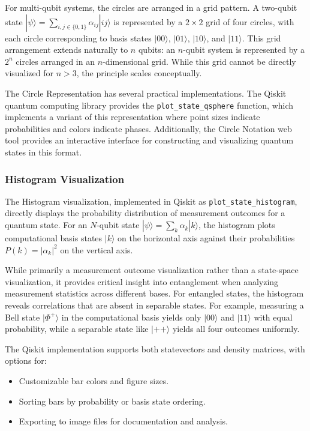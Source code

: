 \documentclass[%
 amsmath,amssymb,
 aps,
rmp,
]{revtex4-2}
\begin{document}


For multi-qubit systems, the circles are arranged in a grid pattern. A two-qubit state $|\psi\rangle = \sum_{i,j \in \{0,1\}} \alpha_{ij}|ij\rangle$ is represented by a $2 \times 2$ grid of four circles, with each circle corresponding to basis states $|00\rangle$, $|01\rangle$, $|10\rangle$, and $|11\rangle$. This grid arrangement extends naturally to $n$ qubits: an $n$-qubit system is represented by a $2^n$ circles arranged in an $n$-dimensional grid. While this grid cannot be directly visualized for $n > 3$, the principle scales conceptually.

The Circle Representation has several practical implementations. The Qiskit quantum computing library provides the \texttt{plot\_state\_qsphere} function, which implements a variant of this representation where point sizes indicate probabilities and colors indicate phases. Additionally, the Circle Notation web tool provides an interactive interface for constructing and visualizing quantum states in this format.



\subsubsection{Histogram Visualization}
\label{sec:histogram}

The Histogram visualization, implemented in Qiskit as \texttt{plot\_state\_histogram}, directly displays the probability distribution of measurement outcomes for a quantum state. For an $N$-qubit state $|\psi\rangle = \sum_{k} \alpha_k |k\rangle$, the histogram plots computational basis states $|k\rangle$ on the horizontal axis against their probabilities $P(k) = |\alpha_k|^2$ on the vertical axis.

While primarily a measurement outcome visualization rather than a state-space visualization, it provides critical insight into entanglement when analyzing measurement statistics across different bases. For entangled states, the histogram reveals correlations that are absent in separable states. For example, measuring a Bell state $|\Phi^+\rangle$ in the computational basis yields only $|00\rangle$ and $|11\rangle$ with equal probability, while a separable state like $|++\rangle$ yields all four outcomes uniformly.

The Qiskit implementation supports both statevectors and density matrices, with options for:
\begin{itemize}
	\item Customizable bar colors and figure sizes.
	\item Sorting bars by probability or basis state ordering.
	\item Exporting to image files for documentation and analysis.
\end{itemize}
\end{document}
